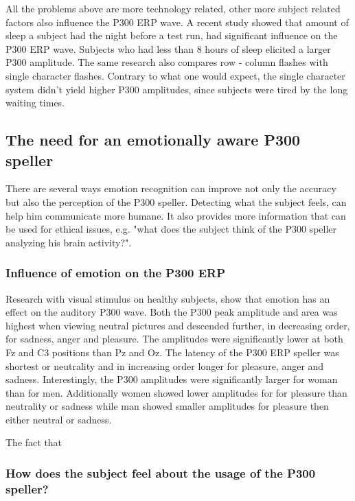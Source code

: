 \npar

All the problems above are more technology related, other more subject related factors also influence the P300 ERP wave. A recent study showed that amount of sleep a subject had the night before a test run, had significant influence on the P300 ERP wave. Subjects who had less than 8 hours of sleep elicited a larger P300 amplitude\cite{HowManyPeople}. The same research also compares row - column flashes with single character flashes. Contrary to what one would expect, the single character system didn't yield higher P300 amplitudes, since subjects were tired by the long waiting times. 

\subsection{The need for an emotionally aware P300 speller}

There are several ways emotion recognition can improve not only the accuracy but also the perception of the P300 speller. Detecting what the subject feels, can help him communicate more humane. It also provides more information that can be used for ethical issues, e.g. "what does the subject think of the P300 speller analyzing his brain activity?".

\subsubsection{Influence of emotion on the P300 ERP}

Research with visual stimulus on healthy subjects, show that emotion has an effect on the auditory P300 wave\cite{AuditoryP300Effect}. Both the P300 peak amplitude and area was highest when viewing neutral pictures and descended further, in decreasing order, for sadness, anger and pleasure. The amplitudes were significantly lower at both Fz and C3 positions than Pz and Oz. The latency of the P300 ERP speller was shortest or neutrality and in increasing order longer for pleasure, anger and sadness. Interestingly, the P300 amplitudes were significantly larger for woman than for men. Additionally women showed lower amplitudes for for pleasure than neutrality or sadness while man showed smaller amplitudes for pleasure then either neutral or sadness. 

\npar

The fact that 



\subsubsection{How does the subject feel about the usage of the P300 speller?}


